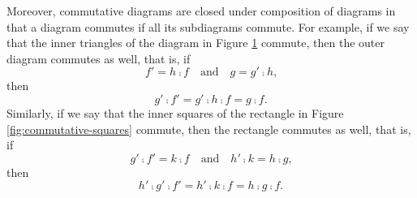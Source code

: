 \begin{remark}
  \label{re:commutative-diagram}



  Moreover, commutative diagrams are closed under composition of
  diagrams in that a diagram commutes if all its subdiagrams commute.
  For example, if we say that the inner triangles of the diagram in
  Figure \ref{fig:commutative-triangles} commute, then the outer
  diagram commutes as well, that is, if
  \begin{equation*}
    f' = h \comp f
    \quad
    \text{and}
    \quad
    g = g' \comp h
    \text{,}
  \end{equation*}
  then
  \begin{equation*}
    g' \comp f' = g' \comp h \comp f = g \comp f
    \text{.}
  \end{equation*}
  Similarly, if we say that the inner squares of the rectangle in
  Figure \ref{fig:commutative-squares} commute, then the rectangle
  commutes as well, that is, if
  \begin{equation*}
    g' \comp f' = k \comp f
    \quad
    \text{and}
    \quad
    h' \comp k = h \comp g
    \text{,}
  \end{equation*}
  then
  \begin{equation*}
    h' \comp g' \comp f' = h' \comp k \comp f = h \comp g \comp f
    \text{.}
  \end{equation*}

  \begin{figure}[htbp]
    \begin{subfigure}{0.5\linewidth}
      \begin{center}
      \end{center}
      \caption{}
      \label{fig:commutative-triangles}
    \end{subfigure}
    \begin{subfigure}{0.5\linewidth}
      \begin{center}
\end{center}
\end{subfigure}
\end{figure}
\end{remark}
